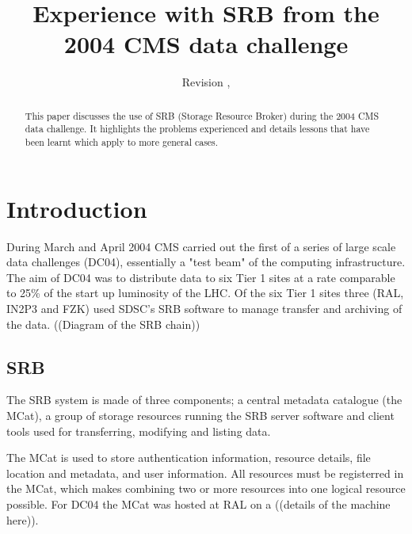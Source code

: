 \documentclass{cmspaper}
\begin{document}
\begin{titlepage}
  \date{Revision \RCSRevision, \RCSDate}
  \title{Experience with SRB from the 2004 CMS data challenge}

  \begin{Authlist}
  \end{Authlist}


  \begin{abstract}
	This paper discusses the use of SRB (Storage Resource Broker) during the 2004 CMS
	data challenge. It highlights the problems experienced and details lessons that 
	have been learnt which apply to more general cases.
  \end{abstract} 

\end{titlepage}

\setcounter{page}{2}

\section{Introduction}
During March and April 2004 CMS carried out the first of a series of large scale data challenges (DC04), 
essentially a "test beam" of the computing infrastructure. The aim of DC04 was to distribute data 
to six Tier 1 sites at a rate comparable to 25\% of the start up luminosity of the LHC.
Of the six Tier 1 sites three (RAL, IN2P3 and FZK) used SDSC's SRB software to manage transfer and 
archiving of the data.
((Diagram of the SRB chain))

\subsection{SRB}

The SRB system is made of three components; a central metadata catalogue (the MCat), a group of storage 
resources running the SRB server software and client tools used for transferring, modifying and listing data.

The MCat is used to store authentication information, resource details, file location and metadata, 
and user information. All resources must be registerred in the MCat, which makes combining two or 
more resources into one logical resource possible. For DC04 the MCat was hosted at RAL on a ((details of 
the machine here)).
\end{document}
